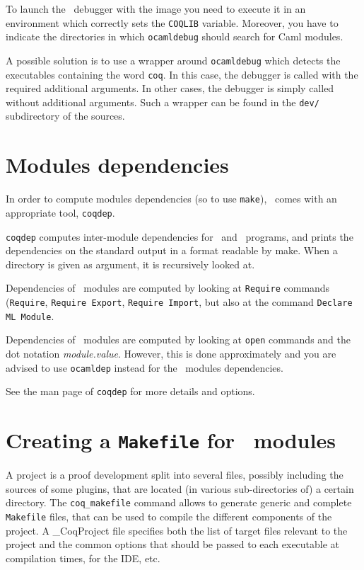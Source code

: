 To launch the \ocaml\ debugger with the image you need to execute it in
an environment which correctly sets the \texttt{COQLIB} variable.
Moreover, you have to indicate the directories in which
\texttt{ocamldebug} should search for Caml modules.

A possible solution is to use a wrapper around \texttt{ocamldebug}
which detects the executables containing the word \texttt{coq}. In
this case, the debugger is called with the required additional
arguments. In other cases, the debugger is simply called without additional
arguments. Such a wrapper can be found in the \texttt{dev/}
subdirectory of the sources.

\section[Modules dependencies]{Modules dependencies\label{Dependencies}
  }

In order to compute modules dependencies (so to use {\tt make}),
\Coq\ comes with an appropriate tool, {\tt coqdep}.

{\tt coqdep} computes inter-module dependencies for \Coq\ and
\ocaml\ programs, and prints the dependencies on the standard
output in a format readable by make.  When a directory is given as
argument, it is recursively looked at.

Dependencies of \Coq\ modules are computed by looking at {\tt Require}
commands ({\tt Require}, {\tt Requi\-re Export}, {\tt Require Import},
but also at the command {\tt Declare ML Module}.

Dependencies of \ocaml\ modules are computed by looking at
\verb!open! commands and the dot notation {\em module.value}. However,
this is done approximately and you are advised to use {\tt ocamldep}
instead for the \ocaml\ modules dependencies.

See the man page of {\tt coqdep} for more details and options.


\section[Creating a {\tt Makefile} for \Coq\ modules]
{Creating a {\tt Makefile} for \Coq\ modules
\label{Makefile}
}

A project is a proof development split into several files, possibly
including the sources of some {\ocaml} plugins, that are located (in
various sub-directories of) a certain directory. The
\texttt{coq\_makefile} command allows to generate generic and complete
\texttt{Makefile} files, that can be used to compile the different
components of the project. A \_CoqProject file
specifies both the list of target files relevant to the project
and the common options that should be passed to each executable at
compilation times, for the IDE, etc.

